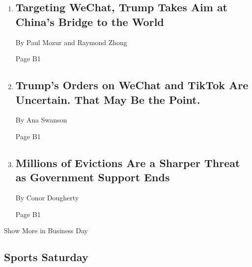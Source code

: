 \begin{enumerate}
\def\labelenumi{\arabic{enumi}.}
\item
  \href{/2020/08/07/business/trump-china-wechat-tiktok.html}{}

  \hypertarget{targeting-wechat-trump-takes-aim-at-chinas-bridge-to-the-world-1}{%
  \subsection{Targeting WeChat, Trump Takes Aim at China's Bridge to the
  World}\label{targeting-wechat-trump-takes-aim-at-chinas-bridge-to-the-world-1}}

  By Paul Mozur and Raymond Zhong

  Page B1
\item
  \href{/2020/08/07/business/economy/trump-executive-order-tiktok-wechat.html}{}

  \hypertarget{trumps-orders-on-wechat-and-tiktok-are-uncertain-that-may-be-the-point}{%
  \subsection{Trump's Orders on WeChat and TikTok Are Uncertain. That
  May Be the
  Point.}\label{trumps-orders-on-wechat-and-tiktok-are-uncertain-that-may-be-the-point}}

  By Ana Swanson

  Page B1
\item
  \href{/2020/08/07/business/economy/housing-economy-eviction-renters.html}{}

  \hypertarget{millions-of-evictions-are-a-sharper-threat-as-government-support-ends-1}{%
  \subsection{Millions of Evictions Are a Sharper Threat as Government
  Support
  Ends}\label{millions-of-evictions-are-a-sharper-threat-as-government-support-ends-1}}

  By Conor Dougherty

  Page B1
\end{enumerate}

Show More in Business Day

\hypertarget{sports-saturday}{%
\subsection{Sports Saturday}\label{sports-saturday}}

